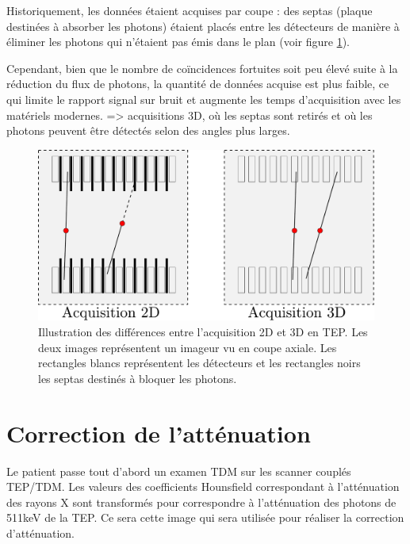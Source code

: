 Historiquement, les données étaient acquises par coupe : des septas (plaque destinées à absorber les photons) étaient placés entre les détecteurs de manière à éliminer les photons qui n'étaient pas émis dans le plan (voir figure \ref{fig:2D3D}). 

Cependant, bien que le nombre de coïncidences fortuites soit peu élevé suite à la réduction du flux de photons, la quantité de données acquise est plus faible, ce qui limite le rapport signal sur bruit et augmente les temps d'acquisition avec les matériels modernes. => acquisitions 3D, où les septas sont retirés et où les photons peuvent être détectés selon des angles plus larges.


\begin{figure}
\centering
\includegraphics[width=12cm]{images/2D3D}
\caption[Acquisitions 2D et 3D en TEP]{Illustration des différences entre l'acquisition 2D et 3D en TEP. Les deux images représentent un imageur vu en coupe axiale. Les rectangles blancs représentent les détecteurs et les rectangles noirs les septas destinés à bloquer les photons. }
\label{fig:2D3D}
\end{figure}


	\section{Correction de l'atténuation}

\label{CorrectionAttenuation}

Le patient passe tout d'abord un examen TDM sur les scanner couplés TEP/TDM. Les valeurs des coefficients Hounsfield correspondant à l'atténuation des rayons X sont transformés pour correspondre à l'atténuation des photons de 511keV de la TEP. Ce sera cette image qui sera utilisée pour réaliser la correction d'atténuation. 

